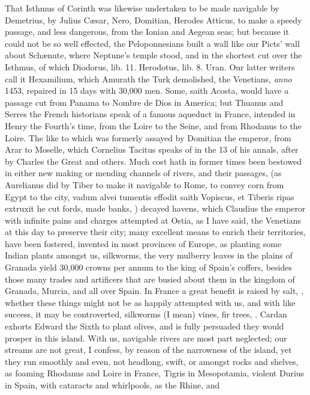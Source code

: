 {That Isthmus of Corinth was likewise undertaken to be made navigable by
Demetrius, by Julius C\ae{}sar, Nero, Domitian, Herodes Atticus, to make a
speedy passage, and less dangerous, from the Ionian and Aegean
seas; but because it could not be so well effected, the Peloponnesians
built a wall like our Picts' wall about Sch\ae{}nute, where Neptune's
temple stood, and in the shortest cut over the Isthmus, of which
Diodorus, lib. 11. Herodotus, lib. 8. Uran. Our latter writers call it
Hexamilium, which Amurath the Turk demolished, the Venetians, \emph{anno}
1453, repaired in 15 days with 30,000 men. Some, saith Acosta, would
have a passage cut from Panama to Nombre de Dios in America; but
Thuanus and Serres the French historians speak of a famous aqueduct in
France, intended in Henry the Fourth's time, from the Loire to the
Seine, and from Rhodanus to the Loire. The like to which was formerly
assayed by Domitian the emperor, from Arar to Moselle, which
Cornelius Tacitus speaks of in the 13 of his annals, after by Charles
the Great and others. Much cost hath in former times been bestowed in
either new making or mending channels of rivers, and their passages,
(as Aurelianus did by Tiber to make it navigable to Rome, to convey
corn from Egypt to the city, vadum alvei tumentis effodit saith
Vopiscus, et Tiberis ripas extruxit he cut fords, made banks, \etc{})
decayed havens, which Claudius the emperor with infinite pains and
charges attempted at Ostia, as I have said, the Venetians at this day
to preserve their city; many excellent means to enrich their
territories, have been fostered, invented in most provinces of Europe,
as planting some Indian plants amongst us, silkworms, the very
mulberry leaves in the plains of Granada yield 30,000 crowns per annum
to the king of Spain's coffers, besides those many trades and
artificers that are busied about them in the kingdom of Granada,
Murcia, and all over Spain. In France a great benefit is raised by
salt, \etc{}, whether these things might not be as happily attempted with
us, and with like success, it may be controverted, silkworms (I mean)
vines, fir trees, \etc{}. Cardan exhorts Edward the Sixth to plant olives,
and is fully persuaded they would prosper in this island. With us,
navigable rivers are most part neglected; our streams are not great, I
confess, by reason of the narrowness of the island, yet they run
smoothly and even, not headlong, swift, or amongst rocks and shelves,
as foaming Rhodanus and Loire in France, Tigris in Mesopotamia, violent
Durius in Spain, with cataracts and whirlpools, as the Rhine, and
}
